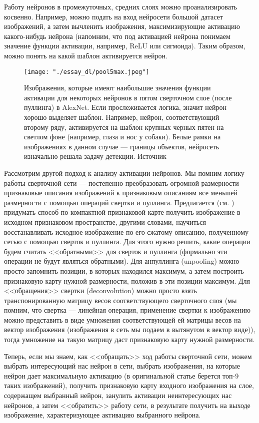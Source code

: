\documentclass[12pt,fleqn]{article}
\begin{document}
Работу нейронов в промежуточных, средних слоях можно проанализировать косвенно.
Например, можно подать на вход нейросети большой датасет изображений, а затем вычленить изображения, максимизирующие активацию какого-нибудь нейрона (напомним, что под активацией нейрона понимаем значение функции активации, например, ReLU или сигмоида). Таким образом, можно понять на какой шаблон активируется нейрон.

\begin{figure}[H]
\centering
\texttt{[image: "./essay\_dl/pool5max.jpeg"]}
\caption{Изображения, которые имеют наибольшие значения функции активации для некоторых нейронов в пятом сверточном слое (после пуллинга) в AlexNet. Если прослеживается логика, значит нейрон хорошо выделяет шаблон. Например, нейрон, соответствующий второму ряду, активируется на шаблон крупных черных пятен на светлом фоне (например, глаза и нос у собаки). Белые рамки на изображениях в данном случае --- границы объектов, нейросеть изначально решала задачу детекции. Источник \cite{CS231N}}
\end{figure}

Рассмотрим другой подход к анализу активации нейронов. Мы помним логику работы сверточной сети --- постепенно преобразовать огромной размерности признаковые описания изображений к признаковым описаниям все меньшей размерности с помощью операций свертки и пуллинга. Предлагается (см. \cite{deconv}) придумать способ по компактной признаковой карте получить изображение в исходном признаковом пространстве, другими словами, научиться восстанавливать исходное изображение по его сжатому описанию, полученному сетью с помощью сверток и пуллинга. Для этого нужно решить, какие операции будем считать <<обратными>> для сверток и пуллинга (формально эти операции не будут являться обратными). Для анпуллинга (unpooling) можно просто запомнить позиции, в которых находился максимум, а затем построить признаковую карту нужной размерности, положив в эти позиции максимум. Для <<обращения>> свертки (deconvolution) можно просто взять транспонированную матрицу весов соответствующего сверточного слоя (мы помним, что свертка --- линейная операция, применение свертки к изображению можно представить в виде умножения соответствующей ей матрицы весов на вектор изображения (изображения в сеть мы подаем в вытянутом в вектор виде)), тогда умножение на такую матрицу даст признаковую карту нужной размерности.

Теперь, если мы знаем, как <<обращать>> ход работы сверточной сети, можем выбрать интересующий нас нейрон в сети, выбрать изображения, на которые нейрон дает максимальную активацию (в оригинальной статье \cite{deconv} берется топ-9 таких изображений), получить признаковую карту входного изображения на слое, содержащем выбранный нейрон, занулить активации неинтересующих нас нейронов, а затем <<обратить>> работу сети, в результате получить на выходе изображение, характеризующее активацию выбранного нейрона. 
\end{document}
